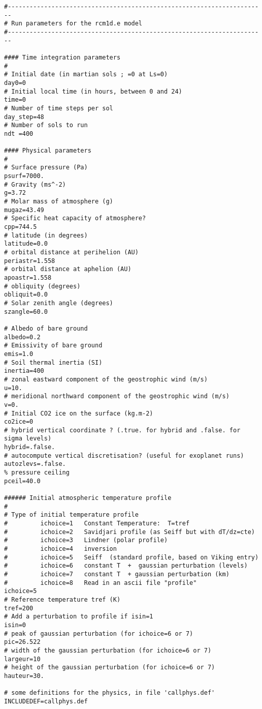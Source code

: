 {\footnotesize
\begin{verbatim}
#-----------------------------------------------------------------------
# Run parameters for the rcm1d.e model
#-----------------------------------------------------------------------

#### Time integration parameters
#
# Initial date (in martian sols ; =0 at Ls=0)
day0=0
# Initial local time (in hours, between 0 and 24)
time=0
# Number of time steps per sol
day_step=48
# Number of sols to run
ndt =400

#### Physical parameters
#
# Surface pressure (Pa)
psurf=7000.
# Gravity (ms^-2)
g=3.72
# Molar mass of atmosphere (g)
mugaz=43.49
# Specific heat capacity of atmosphere?
cpp=744.5
# latitude (in degrees)
latitude=0.0
# orbital distance at perihelion (AU)
periastr=1.558
# orbital distance at aphelion (AU)
apoastr=1.558
# obliquity (degrees)
obliquit=0.0
# Solar zenith angle (degrees)
szangle=60.0

# Albedo of bare ground
albedo=0.2
# Emissivity of bare ground
emis=1.0
# Soil thermal inertia (SI)
inertia=400
# zonal eastward component of the geostrophic wind (m/s)
u=10.
# meridional northward component of the geostrophic wind (m/s)
v=0.
# Initial CO2 ice on the surface (kg.m-2)
co2ice=0
# hybrid vertical coordinate ? (.true. for hybrid and .false. for sigma levels)
hybrid=.false.
# autocompute vertical discretisation? (useful for exoplanet runs)
autozlevs=.false.
% pressure ceiling
pceil=40.0

###### Initial atmospheric temperature profile
#
# Type of initial temperature profile
#         ichoice=1   Constant Temperature:  T=tref
#         ichoice=2   Savidjari profile (as Seiff but with dT/dz=cte)
#         ichoice=3   Lindner (polar profile)
#         ichoice=4   inversion
#         ichoice=5   Seiff  (standard profile, based on Viking entry)
#         ichoice=6   constant T  +  gaussian perturbation (levels)
#         ichoice=7   constant T  + gaussian perturbation (km)
#         ichoice=8   Read in an ascii file "profile"
ichoice=5
# Reference temperature tref (K)
tref=200
# Add a perturbation to profile if isin=1
isin=0
# peak of gaussian perturbation (for ichoice=6 or 7)
pic=26.522
# width of the gaussian perturbation (for ichoice=6 or 7)
largeur=10
# height of the gaussian perturbation (for ichoice=6 or 7)
hauteur=30.

# some definitions for the physics, in file 'callphys.def'
INCLUDEDEF=callphys.def
\end{verbatim}
}
